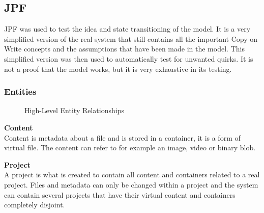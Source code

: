 \documentclass[a4paper,12pt]{article}
\begin{document}
\subsection{JPF}
JPF was used to test the idea and state transitioning of the model. It is a very simplified
version of the real system that still contains all the important Copy-on-Write concepts and the 
assumptions that have been made in the model. This simplified version was then used to automatically
test for unwanted quirks. It is not a proof that the model works, but it is very exhaustive in its
testing.

\subsubsection{Entities}
\begin{figure}[H] 
    \caption{High-Level Entity Relationships}
    \label{fig:relation}
\end{figure}

\hfill \par \textbf{Content} \\
Content is metadata about a file and is stored in a container, it is a form of virtual file.  The
content can refer to for example an image, video or binary blob.\\

\par \textbf{Project} \\
A project is what is created to contain all content and containers related to a real project. Files
and metadata can only be changed within a project and the system can contain several projects 
that have their virtual content and containers completely disjoint.\\
\end{document}
